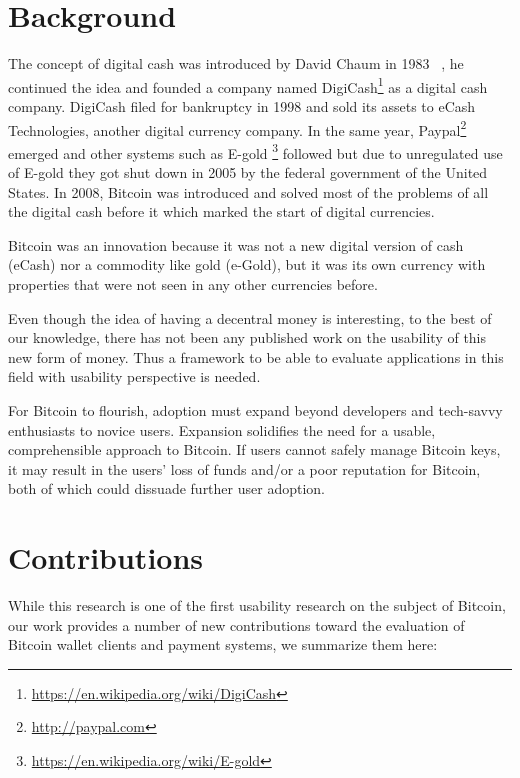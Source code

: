\section{Background}
The concept of digital cash was introduced by David Chaum in 1983 ~\cite{chaum1983blind}, he continued the idea and founded a company named DigiCash\footnote{\url{https://en.wikipedia.org/wiki/DigiCash}} as a digital cash company. DigiCash filed for bankruptcy in 1998 and sold its assets to eCash Technologies, another digital currency company. In the same year, Paypal\footnote{\url{http://paypal.com}} emerged and other systems such as E-gold \footnote{\url{https://en.wikipedia.org/wiki/E-gold}} followed but due to unregulated use of E-gold they got shut down in 2005 by the federal government of the United States. In 2008, Bitcoin was introduced and solved most of the problems of all the digital cash before it which marked the start of digital currencies.

Bitcoin was an innovation because it was not a new digital version of cash (eCash) nor a commodity like gold (e-Gold), but it was its own currency with properties that were not seen in any other currencies before.

Even though the idea of having a decentral money is interesting, to the best of our knowledge, there has not been any published work on the usability of this new form of money. Thus a framework to be able to evaluate applications in this field with usability perspective is needed.

For Bitcoin to flourish, adoption must expand beyond developers and tech-savvy enthusiasts to novice users. Expansion solidifies the need for a usable, comprehensible approach to Bitcoin. If users cannot safely manage Bitcoin keys, it may result in the users' loss of funds and/or a poor reputation for Bitcoin, both of which could dissuade further user adoption. 






\section{Contributions}
While this research is one of the first usability research on the subject of Bitcoin, our work provides a number of new contributions toward the evaluation of Bitcoin wallet clients and payment systems, we summarize them here:

